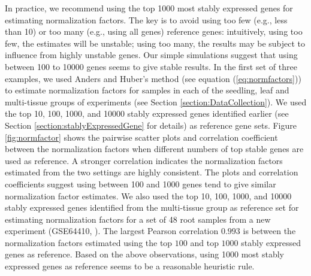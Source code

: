 \documentclass[fleqn,10pt,lineno]{wlpeerj} %
\begin{document}
			In practice, we recommend using the top 1000 most stably expressed genes for
			estimating normalization factors. The key is to avoid using too few (e.g.,
			less than 10) or too many (e.g., using all genes) reference genes:
			intuitively, using too few, the estimates will be unstable; using too many,
			the results may be subject to influence from highly unstable genes.
			Our simple simulations suggest that using between 100 to 10000 genes seems to
			give stable results. In the first set of three examples, we used Anders and
			Huber's method (see equation (\ref{eq:normfactors})) to estimate normalization
			factors for samples in each of the seedling, leaf and multi-tissue groups of
			experiments (see Section \ref{section:DataCollection}).  We used the top 10,
			100, 1000, and 10000 stably expressed genes identified earlier (see Section
			\ref{section:stablyExpressedGene} for details) as reference gene sets. Figure
			\ref{fig:normfactor} shows the pairwise scatter plots and correlation
			coefficient between the normalization factors when different numbers of top
			stable genes are used as reference. A stronger correlation indicates the
			normalization factors estimated from the two settings are highly consistent.
			The plots and correlation coefficients suggest using between 100 and 1000
			genes tend to give similar normalization factor estimates. We also used the
			top 10, 100, 1000, and 10000 stably expressed genes identified from the
			multi-tissue group as reference set for estimating normalization factors for a set
			of 48 root samples from a new experiment (GSE64410, \cite{vragovic2015translatome}). 
			The largest Pearson correlation
			$0.993$ is between the normalization factors estimated using the top $100$
			and top $1000$ stably expressed genes as reference. Based on the above
			observations, using 1000 most stably expressed genes as reference seems to be
			a reasonable heuristic rule.
			
			
			
			
\end{document}
